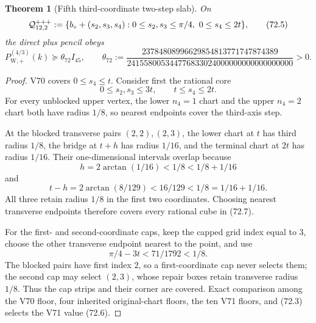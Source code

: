 \documentclass[11pt,oneside]{article}
\newtheorem{theorem}{Theorem}[section]
\theoremstyle{definition}
\theoremstyle{remark}
\begin{document}
\begin{theorem}[Fifth third-coordinate two-step slab]
\label{thm:newv72-two-step-slab}
On
\[
 {\cal Q}^{+++}_{12,2}:=
 \{b_\circ+(s_2,s_3,s_4):
 0\le s_2,s_3\le\pi/4,\ 0\le s_4\le2t\},             \tag{72.5}
\]
the direct plus pencil obeys
\[
 P_{\mathrm W,+}^{(4/3)}(k)
 \succeq\theta_{72}I_{45},\qquad
 \theta_{72}:=
 \frac{23784808996629854813771747874389}
 {241558005344776833024000000000000000000}>0.         \tag{72.6}
\]
\end{theorem}

\begin{proof}
V70 covers \(0\le s_4\le t\).  Consider first the rational core
\[
 0\le s_2,s_3\le3t,\qquad t\le s_4\le2t.             \tag{72.7}
\]
For every unblocked upper vertex, the lower \(n_4=1\) chart and the
upper \(n_4=2\) chart both have radius \(1/8\), so nearest endpoints
cover the third-axis step.

At the blocked transverse pairs \((2,2),(2,3)\), the lower chart at
\(t\) has third radius \(1/8\), the bridge at \(t+h\) has radius
\(1/16\), and the terminal chart at \(2t\) has radius \(1/16\).
Their one-dimensional intervals overlap because
\[
 h=2\arctan(1/16)<1/8<1/8+1/16                     \tag{72.8}
\]
and
\[
 t-h=2\arctan(8/129)<16/129<1/8=1/16+1/16.          \tag{72.9}
\]
All three retain radius \(1/8\) in the first two coordinates.
Choosing nearest transverse endpoints therefore covers every
rational cube in (72.7).

For the first- and second-coordinate caps, keep the capped grid
index equal to \(3\), choose the other transverse endpoint nearest
to the point, and use
\[
 \pi/4-3t<71/1792<1/8.                               \tag{72.10}
\]
The blocked pairs have first index \(2\), so a first-coordinate cap
never selects them; the second cap may select \((2,3)\), whose
repair boxes retain transverse radius \(1/8\).  Thus the cap strips
and their corner are covered.  Exact comparison among the V70
floor, four inherited original-chart floors, the ten V71 floors,
and (72.3) selects the V71 value (72.6).
\end{proof}
\end{document}
